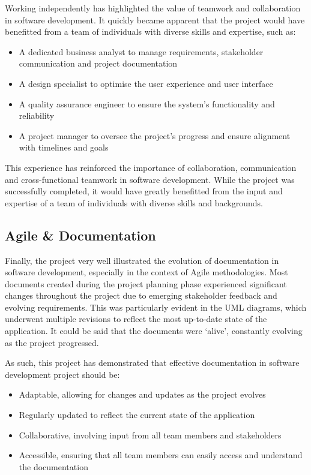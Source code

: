 Working independently has highlighted the value of teamwork and collaboration in software development. It quickly became apparent that the project would have benefitted from a team of individuals with diverse skills and expertise, such as:

\begin{itemize}
    \item A dedicated business analyst to manage requirements, stakeholder communication and project documentation
    \item A design specialist to optimise the user experience and user interface
    \item A quality assurance engineer to ensure the system's functionality and reliability
    \item A project manager to oversee the project's progress and ensure alignment with timelines and goals
\end{itemize}

This experience has reinforced the importance of collaboration, communication and cross-functional teamwork in software development. While the project was successfully completed, it would have greatly benefitted from the input and expertise of a team of individuals with diverse skills and backgrounds.

\subsection{Agile \& Documentation}

Finally, the project very well illustrated the evolution of documentation in software development, especially in the context of Agile methodologies. Most documents created during the project planning phase experienced significant changes throughout the project due to emerging stakeholder feedback and evolving requirements. This was particularly evident in the UML diagrams, which underwent multiple revisions to reflect the most up-to-date state of the application. It could be said that the documents were `alive', constantly evolving as the project progressed.

As such, this project has demonstrated that effective documentation in software development project should be:

\begin{itemize}
    \item Adaptable, allowing for changes and updates as the project evolves
    \item Regularly updated to reflect the current state of the application
    \item Collaborative, involving input from all team members and stakeholders
    \item Accessible, ensuring that all team members can easily access and understand the documentation
\end{itemize}

